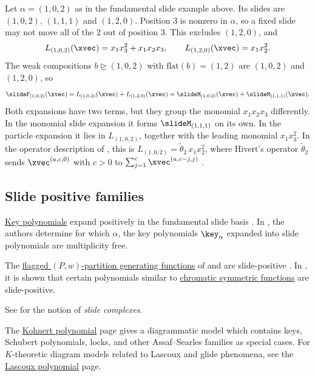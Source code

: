 \begin{example}
Let $\alpha=(1,0,2)$ as in the fundamental slide example above.
Its slides are $(1,0,2)$, $(1,1,1)$ and $(1,2,0)$.
Position $3$ is nonzero in $\alpha$, so a fixed slide may not move all of the
$2$ out of position $3$.  This excludes $(1,2,0)$, and
\[
L_{(1,0,2)}(\xvec)=x_1x_3^2+x_1x_2x_3,
\qquad
L_{(1,2,0)}(\xvec)=x_1x_2^2.
\]
The weak compositions $b\trianglerighteq(1,0,2)$ with
$\mathrm{flat}(b)=(1,2)$ are $(1,0,2)$ and $(1,2,0)$, so
\[
\slideF_{(1,0,2)}(\xvec)
=
L_{(1,0,2)}(\xvec)+L_{(1,2,0)}(\xvec)
=
\slideM_{(1,0,2)}(\xvec)+\slideM_{(1,1,1)}(\xvec).
\]
Both expansions have two terms, but they group the monomial $x_1x_2x_3$
differently.  In the monomial slide expansion it forms
$\slideM_{(1,1,1)}$ on its own.  In the particle expansion it lies in
$L_{(1,0,2)}$, together with the leading monomial $x_1x_3^2$.
In the operator description of \cite{HicksNiese2024x}, this is
$L_{(1,0,2)}=\tilde{\theta}_2\, x_1x_2^2$, where Hivert's operator
$\tilde{\theta}_2$ sends $\xvec^{(a,c,0)}$ with $c>0$ to
$\sum_{j=1}^{c} \xvec^{(a,c-j,j)}$
\cite[Def.~3.1, Lem.~3.3, Lem.~3.4 and Cor.~3.11]{HicksNiese2024x}.
\end{example}


\subsection[slidePositive]{Slide positive families}

\hyperref[key]{Key polynomials} expand positively in the
fundamental slide basis \cite[Thm.~2.13]{AssafSearles2018}.
In \cite{ChoWilligenburg2022}, the authors determine for which $\alpha$,
the key polynomials $\key_\alpha$ expanded into slide polynomials are multiplicity free.

The \hyperref[pPartitionsFlagged]{flagged $(P,w)$-partition generating functions}
of  and  are slide-positive
\cite{AssafBergeron2019}.
In \cite{TewariWilsonZhang2022}, it is shown that certain polynomials similar to 
\hyperref[chromaticQuasisymmetric]{chromatic symmetric functions} are slide-positive.


See \cite{SmirnovTutubalina2021} for the notion of \emph{slide complexes}.

The \hyperref[kohnert]{Kohnert polynomial} page gives a diagrammatic model
which contains keys, Schubert polynomials, locks, and other Assaf--Searles
families as special cases.  For $K$-theoretic diagram models related to
Lascoux and glide phenomena, see the \hyperref[lascoux]{Lascoux polynomial}
page.


